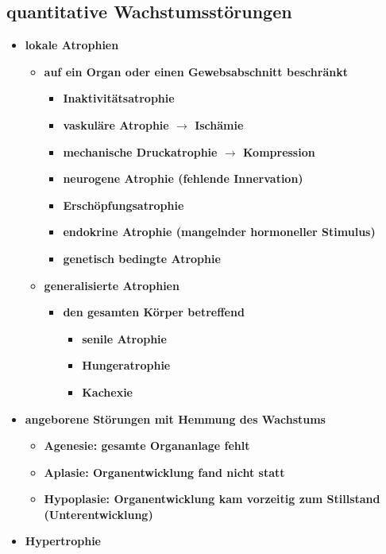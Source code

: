 \subsection{quantitative Wachstumsstörungen}
	\begin{itemize}
		\item \textbf{lokale Atrophien}
			\begin{itemize}
				\item \textbf{auf ein Organ oder einen Gewebsabschnitt beschränkt}
					\begin{itemize}
						\item \textbf{Inaktivitätsatrophie}
						\item \textbf{vaskuläre Atrophie $\rightarrow$ Ischämie}
						\item \textbf{mechanische Druckatrophie $\rightarrow$ Kompression}
						\item \textbf{neurogene Atrophie (fehlende Innervation)}
						\item \textbf{Erschöpfungsatrophie}
						\item \textbf{endokrine Atrophie (mangelnder hormoneller Stimulus)}
						\item \textbf{genetisch bedingte Atrophie}
					\end{itemize}
				\item \textbf{generalisierte Atrophien}
					\begin{itemize}
						\item \textbf{den gesamten Körper betreffend}
							\begin{itemize}
								\item \textbf{senile Atrophie}
								\item \textbf{Hungeratrophie}
								\item \textbf{Kachexie}
							\end{itemize}
				\end{itemize}
		\end{itemize}
		\item \textbf{angeborene Störungen mit Hemmung des Wachstums}
			\begin{itemize}
				\item \textbf{Agenesie: gesamte Organanlage fehlt}
				\item \textbf{Aplasie: Organentwicklung fand nicht statt}
				\item \textbf{Hypoplasie: Organentwicklung kam vorzeitig zum Stillstand (Unterentwicklung)}
			\end{itemize}
		\item \textbf{Hypertrophie}

\end{itemize}
